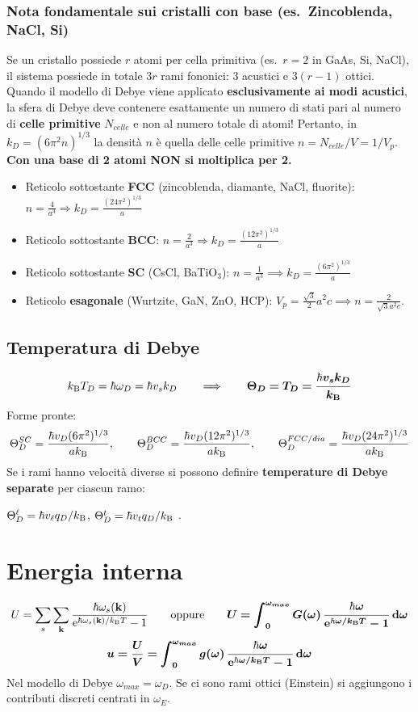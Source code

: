 \subsubsection*{Nota fondamentale sui cristalli con base (es.\ Zincoblenda, NaCl, Si)}
Se un cristallo possiede $r$ atomi per cella primitiva (es.\ $r=2$ in GaAs, Si, NaCl), il sistema possiede in totale $3r$ rami fononici: $3$ acustici e $3(r-1)$ ottici. Quando il modello di Debye viene applicato \textbf{esclusivamente ai modi acustici}, la sfera di Debye deve contenere esattamente un numero di stati pari al numero di \textbf{celle primitive} $N_{celle}$ e non al numero totale di atomi!
Pertanto, in $k_D = (6\pi^2 n)^{1/3}$ la densità $n$ è quella delle celle primitive $n = N_{celle}/V = 1/V_p$. \textbf{Con una base di 2 atomi NON si moltiplica per 2.}
\begin{itemize}
    \item Reticolo sottostante \textbf{FCC} (zincoblenda, diamante, NaCl, fluorite): $n = \frac{4}{a^3} \Rightarrow k_D = \frac{(24\pi^2)^{1/3}}{a}$
    \item Reticolo sottostante \textbf{BCC}: $n = \frac{2}{a^3} \Rightarrow k_D = \frac{(12\pi^2)^{1/3}}{a}$
    \item Reticolo sottostante \textbf{SC} (CsCl, BaTiO$_3$): $n = \frac{1}{a^3} \implies k_D = \frac{(6\pi^2)^{1/3}}{a} $
    \item Reticolo \textbf{esagonale} (Wurtzite, GaN, ZnO, HCP): $V_p = \frac{\sqrt3}{2}a^2c \implies n = \frac{2}{\sqrt3 a^2 c}$.
   
\end{itemize}

\subsection{Temperatura di Debye}
\[ k_{\mathrm{B}} T_D = \hbar\omega_D = \hbar v_s k_D \qquad\Longrightarrow\qquad \bm{\Theta_D = T_D = \frac{\hbar v_s k_D}{k_{\mathrm{B}}}} \]
Forme pronte:
\[ \Theta_D^{SC} = \frac{\hbar v_D (6\pi^2)^{1/3}}{ak_{\mathrm{B}}}, \qquad
   \Theta_D^{BCC} = \frac{\hbar v_D (12\pi^2)^{1/3}}{ak_{\mathrm{B}}}, \qquad
   \Theta_D^{FCC/dia} = \frac{\hbar v_D (24\pi^2)^{1/3}}{ak_{\mathrm{B}}} \]
Se i rami hanno velocità diverse si possono definire \textbf{temperature di Debye separate} per ciascun ramo:

$\Theta_D^{\ell} = \hbar v_\ell q_D/k_{\mathrm{B}}$, $\Theta_D^{t}=\hbar v_t q_D/k_{\mathrm{B}}$ .

\newpage

\section{Energia interna}
\[ U = \sum_{s}\sum_{\mathbf{k}} \frac{\hbar\omega_s(\mathbf{k})}{\mathrm{e}^{\hbar\omega_s(\mathbf{k})/k_{\mathrm{B}} T}-1}
   \qquad\text{oppure}\qquad
   \bm{U = \int_0^{\omega_{max}} G(\omega)\,\frac{\hbar\omega}{\mathrm{e}^{\hbar\omega/k_{\mathrm{B}} T}-1}\,\mathrm{d}\omega} \]
\[ \bm{u = \frac{U}{V} = \int_0^{\omega_{max}} g(\omega)\,\frac{\hbar\omega}{\mathrm{e}^{\hbar\omega/k_{\mathrm{B}} T}-1}\,\mathrm{d}\omega} \]
Nel modello di Debye $\omega_{max}=\omega_D$. Se ci sono rami ottici (Einstein) si aggiungono i contributi discreti centrati in $\omega_E$.

